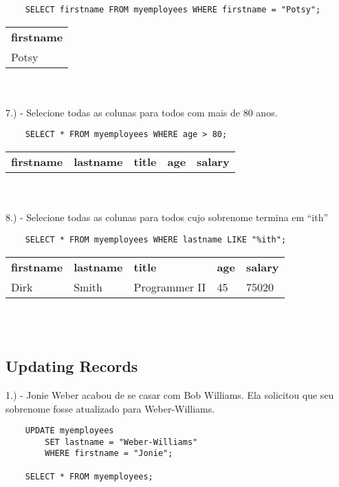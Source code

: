 \begin{lstlisting}
    SELECT firstname FROM myemployees WHERE firstname = "Potsy";
\end{lstlisting}

\begin{tabular}{l}
    {\textbf{firstname}} \\
    {Potsy}          
\end{tabular} \\ \\

7.) - Selecione todas as colunas para todos com mais de 80 anos.

\begin{lstlisting}
    SELECT * FROM myemployees WHERE age > 80;
\end{lstlisting}

\begin{tabular}{l l l l l}
    {\textbf{firstname}} & {\textbf{lastname}} & {\textbf{title}} & {\textbf{age}} & {\textbf{salary}}
\end{tabular} \\ \\

8.) - Selecione todas as colunas para todos cujo sobrenome termina em “ith”

\begin{lstlisting}
    SELECT * FROM myemployees WHERE lastname LIKE "%ith";
\end{lstlisting}

\begin{tabular}{l l l l l}
    {\textbf{firstname}} & {\textbf{lastname}} & {\textbf{title}} & {\textbf{age}} & {\textbf{salary}} \\
    {Dirk}               & {Smith}             & {Programmer II}  & {45}           & {75020}          
\end{tabular} \\ \\


\subsection{Updating Records}

1.) - Jonie Weber acabou de se casar com Bob Williams. Ela solicitou que seu sobrenome fosse atualizado para Weber-Williams.

\begin{lstlisting}
    UPDATE myemployees 
        SET lastname = "Weber-Williams" 
        WHERE firstname = "Jonie";

    SELECT * FROM myemployees;
\end{lstlisting}

